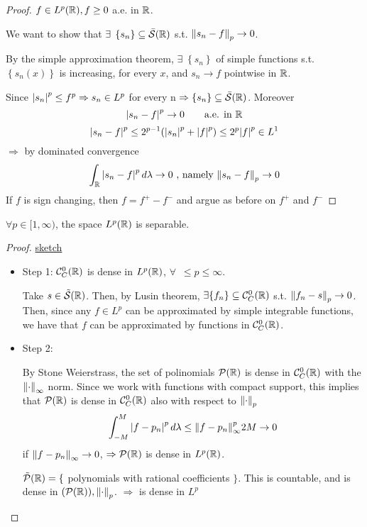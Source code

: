 \begin{proof}
    \(f \in L^p(\mathbb{R}), f \geq 0\) a.e. in \(\mathbb{R}\).

    We want to show that \(\exists \; \left\{ s_n \right\} \subseteq \bar{\mathcal{S}}(\mathbb{R})\) s.t. \(\norm{s_n - f}_p \to 0\).

    By the simple approximation theorem, \(\exists \; \left\{ s_n \right\}\) of simple functions s.t. \(\left\{ s_n(x) \right\}\) is increasing, for every \(x\), and \(s_n \to f\) pointwise in \(\mathbb{R}\).

    Since \(\abs{s_n}^p \leq f^p \Rightarrow s_n \in L^p\) for every n \(\Rightarrow \left\{ s_n \right\} \subseteq \bar{\mathcal{S}}(\mathbb{R})\). Moreover
    \[
        \abs{s_n -f}^p \to 0 \qquad \text{a.e. in } \mathbb{R}
    \]
    \[
        \abs{s_n -f }^p \leq 2^{p-1} (\abs{s_n}^p + \abs{f}^p) \leq 2^p \abs{f}^p \in L^1
    \]
    \(\Rightarrow \) by dominated convergence
    \[
        \int_{\mathbb{R}} \abs{s_n - f }^p \, d\lambda \to 0 \text{ , namely } \norm{s_n -f}_p \to 0
    \]
    If \(f\) is sign changing, then \(f = f^+ - f^-\)  and argue as before on \(f^+\) and \(f^-\)
\end{proof}

\begin{theorem}
    \( \forall p \in [1, \infty)\), the space \(L^p(\mathbb{R})\) is separable. 
\end{theorem}
\begin{proof}
    \underline{sketch}
    \begin{itemize}
        \item Step 1: \(\mathcal{C}_C^0(\mathbb{R}) \) is dense in \(L^p(\mathbb{R} )\), \(\forall \; \ \leq p \leq \infty\).
        
        Take \(s \in \tilde{\mathcal{S}}(\mathbb{R})\). Then, by Lusin theorem, \(\exists \{f_n\} \subseteq \mathcal{C}_C^0(\mathbb{R})\) s.t. \(\norm{f_n -s }_p \to 0\).
        Then, since any \(f \in L^p\) can be approximated by simple integrable functions, we have that \(f\) can be approximated by functions in \(\mathcal{C}_C^0(\mathbb{R})\).

        \item Step 2: 
        
        By Stone Weierstrass, the set of polinomials \(\mathcal{P}(\mathbb{R})\) is dense in \(\mathcal{C}_C^0(\mathbb{R})\) with the \(\norm{\cdot}_\infty\) norm. 
        Since we work with functions with compact support, this implies that \(\mathcal{P}(\mathbb{R})\) is dense in \(\mathcal{C}_C^0(\mathbb{R})\) also with respect to \(\norm{\cdot}_p\)
        \[
            \int_{-M}^M \abs{f - p_n }^p \, d\lambda \leq \norm{f - p_n }^p_\infty 2M \to 0
        \] 
        if \(\norm{f - p_n}_\infty \to 0\), \(\Rightarrow \mathcal{P}(\mathbb{R})\) is dense in \(L^p(\mathbb{R})\).

        \(\tilde{\mathcal{P}}(\mathbb{R}) = \{\) polynomials with rational coefficients \(\}\). 
        This is countable, and is dense in \((\mathcal{P}(\mathbb{R})), \norm{\cdot}_p\). \(\Rightarrow \) is dense in \(L^p\) 
    \end{itemize}
\end{proof}

